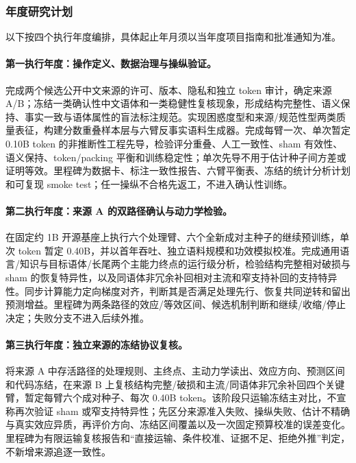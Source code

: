 \justifying
\NSFCBodyText

\subsubsection{年度研究计划}

以下按四个执行年度编排，具体起止年月须以当年度项目指南和批准通知为准。

\paragraph{第一执行年度：操作定义、数据治理与操纵验证。}完成两个候选公开中文来源的许可、版本、隐私和独立 token 审计，确定来源 A/B；冻结一类确认性中文语体和一类稳健性复核现象，形成结构完整性、语义保持、事实一致与语体属性的盲法标注规范。实现困惑度型和来源/规范性型两类质量表征，构建分数重叠样本层与六臂反事实语料生成器。完成每臂一次、单次暂定 0.10B token 的非推断性工程先导，检验评分重叠、人工一致性、sham 有效性、语义保持、token/packing 平衡和训练稳定性；单次先导不用于估计种子间方差或证明等效。里程碑为数据卡、标注一致性报告、六臂平衡表、冻结的统计分析计划和可复现 smoke test；任一操纵不合格先返工，不进入确认性训练。

\paragraph{第二执行年度：来源 A 的双路径确认与动力学检验。}在固定约 1B 开源基座上执行六个处理臂、六个全新成对主种子的继续预训练，单次 token 暂定 0.40B，并以首年吞吐、独立语料规模和功效模拟校准。完成通用语言/知识与目标语体/长尾两个主能力终点的运行级分析，检验结构完整相对破损与 sham 的恢复特异性，以及同语体非冗余补回相对主流和窄支持补回的支持特异性。同步计算能力定向梯度对齐，判断其是否满足处理先行、恢复共同逆转和留出预测增益。里程碑为两条路径的效应/等效区间、候选机制判断和继续/收缩/停止决定；失败分支不进入后续外推。

\paragraph{第三执行年度：独立来源的冻结协议复核。}将来源 A 中存活路径的处理规则、主终点、主动力学读出、效应方向、预测区间和代码冻结，在来源 B 上复核结构完整/破损和主流/同语体非冗余补回四个关键臂，暂定每臂六个成对种子、每次 0.40B token。该阶段只运输冻结主对比，不宣称再次验证 sham 或窄支持特异性；先区分来源准入失败、操纵失败、估计不精确与真实效应异质，再评价方向、冻结区间覆盖以及一次固定预算校准的误差变化。里程碑为有限运输复核报告和“直接运输、条件校准、证据不足、拒绝外推”判定，不新增来源追逐一致性。

